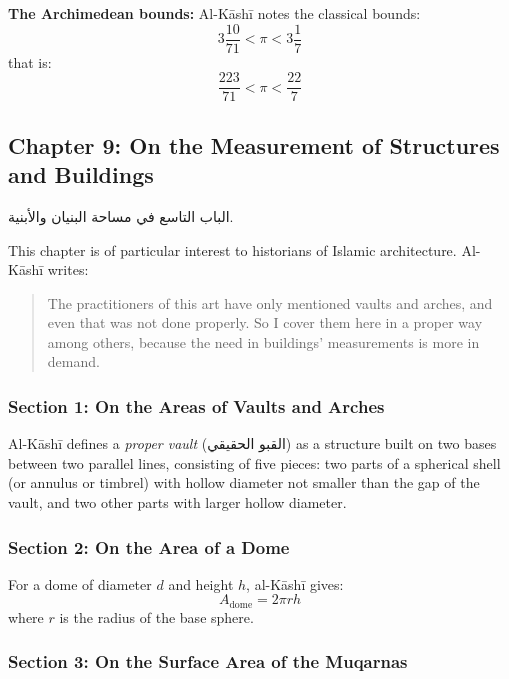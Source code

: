 \documentclass[11pt,a4paper]{article}
\newenvironment{arabicbox}{%
  \begin{framed}
  \begin{minipage}{\dimexpr\linewidth-2\fboxsep-2\fboxrule\relax}
  \setlength{\parindent}{0pt}
  \linespread{1.3}\selectfont
}{%
  \end{minipage}
  \end{framed}
}
\newcommand{\ar}[1]{{\arabicfont\beginR #1\endR}}
\begin{document}
\noindent\textbf{The Archimedean bounds:} Al-K\=ash\=i notes the classical
bounds:
\[
3\frac{10}{71} < \pi < 3\frac{1}{7}
\]
that is:
\[
\frac{223}{71} < \pi < \frac{22}{7}
\]

\subsection{Chapter 9: On the Measurement of Structures and Buildings}

\begin{arabicbox}
\begin{Arabic}
الباب التاسع في مساحة البنيان والأبنية.
\end{Arabic}
\end{arabicbox}

\vspace{0.3cm}

This chapter is of particular interest to historians of Islamic
architecture. Al-K\=ash\=i writes:

\begin{quote}
The practitioners of this art have only mentioned vaults and arches,
and even that was not done properly. So I cover them here in a proper
way among others, because the need in buildings' measurements is more in
demand.
\end{quote}

\subsubsection{Section 1: On the Areas of Vaults and Arches}

Al-K\=ash\=i defines a \textit{proper vault} (\ar{القبو الحقيقي}) as a
structure built on two bases between two parallel lines, consisting of
five pieces: two parts of a spherical shell (or annulus or timbrel) with
hollow diameter not smaller than the gap of the vault, and two other
parts with larger hollow diameter.

\subsubsection{Section 2: On the Area of a Dome}

For a dome of diameter $d$ and height $h$, al-K\=ash\=i gives:
\[
A_{\text{dome}} = 2\pi r h
\]
where $r$ is the radius of the base sphere.

\subsubsection{Section 3: On the Surface Area of the Muqarnas}
\end{document}
